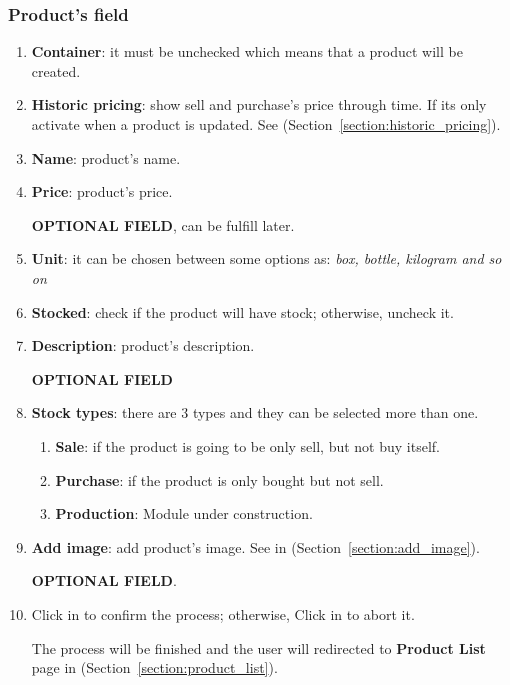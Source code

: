 \documentclass[a4paper,11pt]{refart}
\newcommand\InConstruction{\color{red} Module under construction.}
\begin{document}
\subsubsection{Product's field}
\begin{enumerate}
	\item \textbf{Container}: it must be unchecked which means that a product will be created.	
	\item \textbf{Historic pricing}: show sell and purchase's price through time. If its only activate when a product is updated. See (Section~\ref{section:historic_pricing}).
	\item \textbf{Name}: product's name.
	\item \textbf{Price}: product's price.
		\medskip
		\begin{leftbar}
			\textbf{OPTIONAL FIELD}, can be fulfill later.
		\end{leftbar}
	\item \textbf{Unit}: it can be chosen between some options as: \emph{box, bottle, kilogram and so on}
	\item \textbf{Stocked}: check if the product will have stock; otherwise, uncheck it.
	\item \textbf{Description}: product's description.
		\medskip
		\begin{leftbar}
			\textbf{OPTIONAL FIELD}
		\end{leftbar}
	\item \textbf{Stock types}: there are 3 types and they can be selected more than one.
		\begin{enumerate}
			\item \textbf{Sale}: if the product is going to be only sell, but not buy itself.
			\item \textbf{Purchase}: if the product is only bought but not sell.
			\item \textbf{Production}:  \InConstruction{}
		\end{enumerate}
	\item \textbf{Add image}: add product's image. See in (Section~\ref{section:add_image}).
		\medskip
		\begin{leftbar}
			\textbf{OPTIONAL FIELD}.
		\end{leftbar}
	\item Click in  to confirm the process; otherwise, Click in  to abort it.
		\medskip
		\begin{leftbar}
			The process will be finished and the user will redirected to \textbf{Product List} page in (Section~\ref{section:product_list}).

\end{leftbar}
\end{enumerate}
\end{document}
